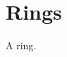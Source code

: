 \documentclass{article}
\begin{document}
\section{Rings}
A \gls{ring}. \ownglossaries{} \ownglossary
\printnoidxglossaries
\end{document}
